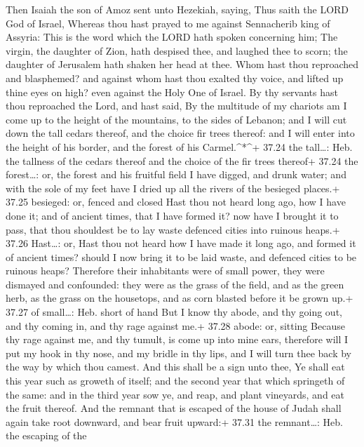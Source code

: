  Then Isaiah the son of Amoz sent unto Hezekiah, saying,
Thus saith the LORD God of Israel, Whereas thou hast prayed to me
against Sennacherib king of Assyria:  This is the word
which the LORD hath spoken concerning him; The virgin, the daughter of
Zion, hath despised thee, and laughed thee to scorn; the daughter of
Jerusalem hath shaken her head at thee.  Whom hast thou
reproached and blasphemed? and against whom hast thou exalted thy voice,
and lifted up thine eyes on high? even against the Holy One of Israel.
 By thy servants hast thou reproached the Lord, and hast
said, By the multitude of my chariots am I come up to the height of the
mountains, to the sides of Lebanon; and I will cut down the tall cedars
thereof, and the choice fir trees thereof: and I will enter into the
height of his border, and the forest of his Carmel.\^{}*\^{}+ 37.24 the
tall\ldots: Heb. the tallness of the cedars thereof and the choice of
the fir trees thereof+ 37.24 the forest\ldots: or, the forest and his
fruitful field  I have digged, and drunk water; and with
the sole of my feet have I dried up all the rivers of the besieged
places.+ 37.25 besieged: or, fenced and closed  Hast thou
not heard long ago, how I have done it; and of ancient times, that I
have formed it? now have I brought it to pass, that thou shouldest be to
lay waste defenced cities into ruinous heaps.+ 37.26 Hast\ldots: or,
Hast thou not heard how I have made it long ago, and formed it of
ancient times? should I now bring it to be laid waste, and defenced
cities to be ruinous heaps?  Therefore their inhabitants
were of small power, they were dismayed and confounded: they were as the
grass of the field, and as the green herb, as the grass on the
housetops, and as corn blasted before it be grown up.+ 37.27 of
small\ldots: Heb. short of hand  But I know thy abode, and
thy going out, and thy coming in, and thy rage against me.+ 37.28 abode:
or, sitting  Because thy rage against me, and thy tumult,
is come up into mine ears, therefore will I put my hook in thy nose, and
my bridle in thy lips, and I will turn thee back by the way by which
thou camest.  And this shall be a sign unto thee, Ye shall
eat this year such as groweth of itself; and the second year that which
springeth of the same: and in the third year sow ye, and reap, and plant
vineyards, and eat the fruit thereof.  And the remnant that
is escaped of the house of Judah shall again take root downward, and
bear fruit upward:+ 37.31 the remnant\ldots: Heb. the escaping of the
